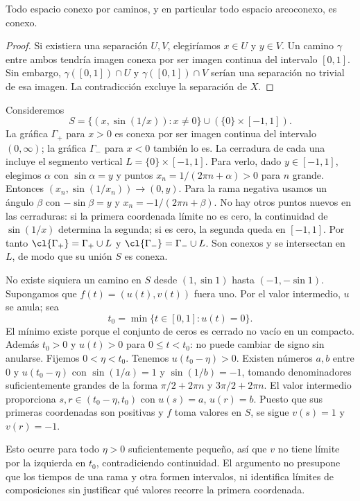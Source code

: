 \begin{proposicion}\label{ch18:arcoimplica}
Todo espacio conexo por caminos, y en particular todo espacio arcoconexo, es conexo.
\end{proposicion}
\begin{proof}
Si existiera una separación $U,V$, elegiríamos $x\in U$ y $y\in V$. Un camino $\gamma$ entre ambos tendría imagen conexa por ser imagen continua del intervalo $[0,1]$. Sin embargo, $\gamma([0,1])\cap U$ y $\gamma([0,1])\cap V$ serían una separación no trivial de esa imagen. La contradicción excluye la separación de $X$.
\end{proof}

\begin{ejemplo}\label{ch18:seno}
Consideremos
\[
S=\{(x,\sin(1/x)):x\ne0\}\cup(\{0\}\times[-1,1]).
\]
La gráfica $\Gamma_+$ para $x>0$ es conexa por ser imagen continua del intervalo $(0,\infty)$; la gráfica $\Gamma_-$ para $x<0$ también lo es. La cerradura de cada una incluye el segmento vertical $L=\{0\}\times[-1,1]$. Para verlo, dado $y\in[-1,1]$, elegimos $\alpha$ con $\sin\alpha=y$ y puntos $x_n=1/(2\pi n+\alpha)>0$ para $n$ grande. Entonces $(x_n,\sin(1/x_n))\to(0,y)$. Para la rama negativa usamos un ángulo $\beta$ con $-\sin\beta=y$ y $x_n=-1/(2\pi n+\beta)$. No hay otros puntos nuevos en las cerraduras: si la primera coordenada límite no es cero, la continuidad de $\sin(1/x)$ determina la segunda; si es cero, la segunda queda en $[-1,1]$. Por tanto $\cl{\Gamma_+}=\Gamma_+\cup L$ y $\cl{\Gamma_-}=\Gamma_-\cup L$. Son conexos y se intersectan en $L$, de modo que su unión $S$ es conexa.

No existe siquiera un camino en $S$ desde $(1,\sin1)$ hasta $(-1,-\sin1)$. Supongamos que $f(t)=(u(t),v(t))$ fuera uno. Por el valor intermedio, $u$ se anula; sea
\[
t_0=\min\{t\in[0,1]:u(t)=0\}.
\]
El mínimo existe porque el conjunto de ceros es cerrado no vacío en un compacto. Además $t_0>0$ y $u(t)>0$ para $0\le t<t_0$: no puede cambiar de signo sin anularse. Fijemos $0<\eta<t_0$. Tenemos $u(t_0-\eta)>0$. Existen números $a,b$ entre $0$ y $u(t_0-\eta)$ con $\sin(1/a)=1$ y $\sin(1/b)=-1$, tomando denominadores suficientemente grandes de la forma $\pi/2+2\pi n$ y $3\pi/2+2\pi n$. El valor intermedio proporciona $s,r\in(t_0-\eta,t_0)$ con $u(s)=a$, $u(r)=b$. Puesto que sus primeras coordenadas son positivas y $f$ toma valores en $S$, se sigue $v(s)=1$ y $v(r)=-1$.

Esto ocurre para todo $\eta>0$ suficientemente pequeño, así que $v$ no tiene límite por la izquierda en $t_0$, contradiciendo continuidad. El argumento no presupone que los tiempos de una rama y otra formen intervalos, ni identifica límites de composiciones sin justificar qué valores recorre la primera coordenada.
\end{ejemplo}

